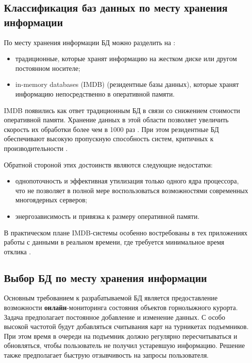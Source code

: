 \clearpage
\subsection{Классификация баз данных по месту хранения информации}

По месту хранения информации БД можно разделить на \cite{inmemory}:
\begin{itemize}
	\item традиционные, которые хранят информацию на жестком диске или другом постоянном носителе; 
	\item in-memory databases (IMDB) (резидентные базы данных), которые хранят информацию непосредственно в оперативной памяти.
\end{itemize}

IMDB появились как ответ традиционным БД в связи со снижением стоимости оперативной памяти. Хранение данных в этой области позволяет увеличить скорость их обработки более чем в 1000 раз \cite{why}. При этом резидентные БД обеспечивают высокую пропускную способность систем, критичных к производительности \cite{adv}.

Обратной стороной этих достоинств являются следующие недостатки:
\begin{itemize}
	\item однопоточность и эффективная утилизация только одного ядра процессора, что не позволяет в полной мере воспользоваться возможностями современных многоядерных серверов;
	\item энергозависимость и привязка к размеру оперативной памяти.
\end{itemize}

В практическом плане IMDB-системы особенно востребованы в тех приложениях работы с данными в реальном времени, где требуется минимальное время отклика \cite{lookslike}.

\subsection{Выбор БД по месту хранения информации}\label{imdb}
Основным требованием к разрабатываемой БД является предоставление возможности \textbf{онлайн}-мониторинга состояния объектов горнолыжного курорта. Задача предполагает постоянное добавление и изменение данных. С особо высокой частотой будут добавляться считывания карт на турникетах подъемников. При этом время в очереди на подъемник должно регулярно пересчитываться и обновляться, чтобы пользователь не получил устаревшую информацию. Решение также предполагает быструю отзывчивость на запросы пользователя.  


